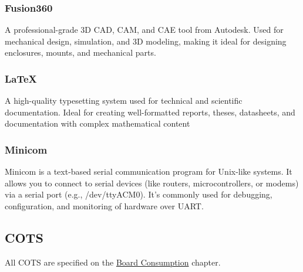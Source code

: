\subsubsection{Fusion360}
A professional-grade 3D CAD, CAM, and CAE tool from Autodesk. Used for mechanical design, simulation, and 3D modeling, making it ideal for designing enclosures, mounts, and mechanical parts.
\subsubsection{\LaTeX}
A high-quality typesetting system used for technical and scientific documentation. Ideal for creating well-formatted reports, theses, datasheets, and documentation with complex mathematical content
\subsubsection{Minicom}
Minicom is a text-based serial communication program for Unix-like systems. It allows you to connect to serial devices (like routers, microcontrollers, or modems) via a serial port (e.g., /dev/ttyACM0). It's commonly used for debugging, configuration, and monitoring of hardware over UART.
\subsection{COTS}
All COTS are specified on the \hyperref[link:Board Consumption]{Board Consumption} chapter.

